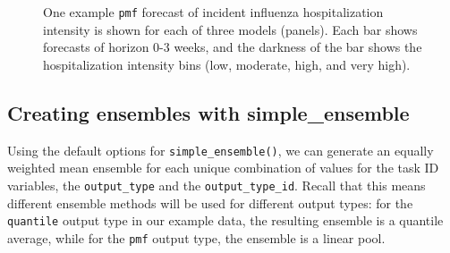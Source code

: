 \documentclass[
  article,
  shortnames,
  notitle]{jss}
\begin{document}
\begin{longtable}[]
\caption{\label{tbl-example-forecasts-pmf}Example \texttt{pmf} model
output for forecasts of incident influenza hospitalization intensity. A
subset of example model output is shown: 1-week ahead pmf forecasts made
on 2022-12-17 for the US from three distinct models. We round the
forecasted probability (in the \texttt{value} column) to two digits. The
\texttt{location}, \texttt{reference\_date} and
\texttt{target\_end\_date} columns have been omitted for brevity. This
example data is provided in the  package and is a
subset of the \texttt{example-complex-forecast-hub} data provided by the
hubverse \citep{hubverse_docs}.}

\tabularnewline
\end{longtable}

\begin{figure}


\caption{\label{fig-plot-ex-mods-pmf}One example \texttt{pmf} forecast
of incident influenza hospitalization intensity is shown for each of
three models (panels). Each bar shows forecasts of horizon 0-3 weeks,
and the darkness of the bar shows the hospitalization intensity bins
(low, moderate, high, and very high).}

\end{figure}%

\subsection{Creating ensembles with
simple\_ensemble}\label{creating-ensembles-with-simple_ensemble}

Using the default options for \texttt{simple\_ensemble()}, we can
generate an equally weighted mean ensemble for each unique combination
of values for the task ID variables, the \texttt{output\_type} and the
\texttt{output\_type\_id}. Recall that this means different ensemble
methods will be used for different output types: for the
\texttt{quantile} output type in our example data, the resulting
ensemble is a quantile average, while for the \texttt{pmf} output type,
the ensemble is a linear pool.
\end{document}
